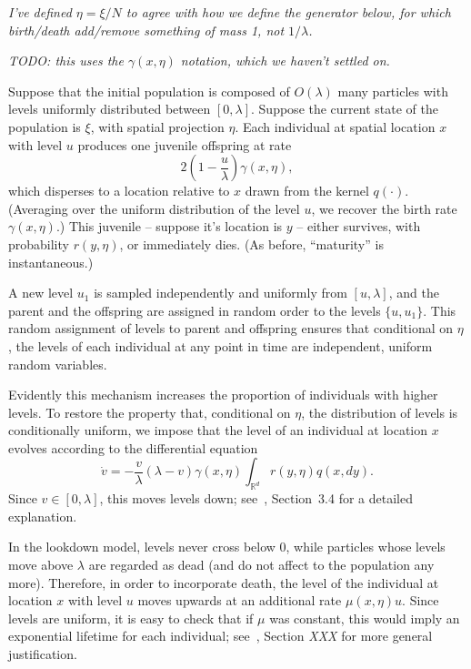 \documentclass[12pt]{article}
\newcommand{\IR}{\mathbb R}
\newcommand{\lp}{\xi}              %
\newcommand{\comment}[1]{{\color{blue} \it #1}}
\begin{document}
\comment{
    I've defined $\eta = \lp / N$ to agree with how we define the generator below,
    for which birth/death add/remove something of mass 1, not $1/\lambda$.
}

\comment{TODO: this uses the $\gamma(x, \eta)$ notation, which we haven't settled on.}

Suppose that the initial population is composed of $O(\lambda)$ many particles
with levels uniformly distributed between $[0, \lambda]$.
Suppose the current state of the population is $\lp$,
with spatial projection $\eta$.
Each individual at spatial location $x$ with level $u$
produces one juvenile offspring at rate 
$$
2 \left(1 - \frac{u}{\lambda}\right) \gamma(x, \eta) ,
$$
which disperses to a location relative to $x$ drawn from the kernel $q(\cdot)$.
(Averaging over the uniform distribution of the level $u$,
we recover the birth rate $\gamma(x, \eta)$.)
This juvenile -- suppose it's location is $y$ --
either survives, with probability $r(y, \eta)$, or immediately dies.
(As before, ``maturity'' is instantaneous.)

A new level $u_1$ is sampled independently and uniformly from $[u,\lambda]$,
and the parent and the offspring are assigned in random order to the levels $\{u, u_1\}$.
This random assignment of levels to parent
and offspring ensures that conditional on $\eta$,
the levels of each individual at any point in time are independent, uniform random variables.

Evidently this mechanism increases the proportion
of individuals with higher levels.
To restore the property that,
conditional on $\eta$,
the distribution of levels is conditionally uniform,
we impose that 
the level of an individual at location $x$
evolves according to the differential equation
$$
    \dot{v}
    =
    - \frac{v}{\lambda} \left(\lambda - v\right)
    \gamma(x, \eta) \int_{\IR^d} r(y, \eta) q(x, dy) .
$$
Since $v \in [0, \lambda]$, this moves levels down;
see~\cite{etheridge/kurtz:2018}, Section~3.4 for a detailed explanation.

In the lookdown model, levels never cross below 0,
while particles whose levels move above $\lambda$ are regarded as dead
(and do not affect to the population any more).
Therefore, in order to incorporate death,
the level of the individual at location $x$ with level $u$
moves upwards at an additional rate $\mu(x,\eta) u$.
Since levels are uniform,
it is easy to check that if $\mu$ was constant,
this would imply an exponential lifetime for each individual;
see~\cite{etheridge/kurtz:2018}, Section \comment{XXX}
for more general justification.
\end{document}

